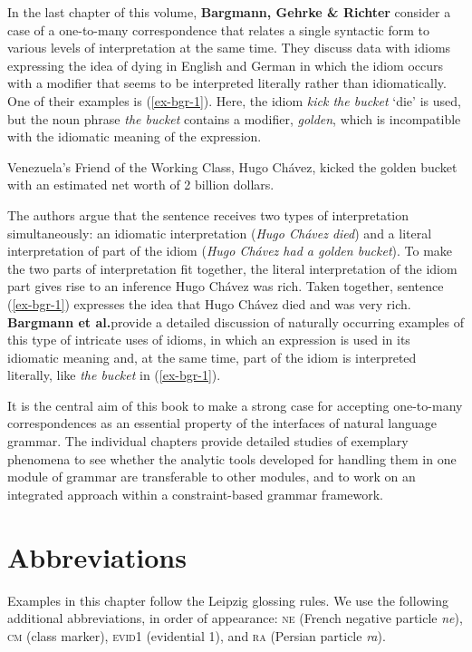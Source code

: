 \documentclass[output=paper]{langscibook}
\begin{document}
\bigskip\noindent In the last chapter of this volume,
\textbf{Bargmann, Gehrke \& Richter} consider a case of a one-to-many
correspondence that relates a single syntactic form to various levels
of interpretation at the same time.  They discuss data with idioms
expressing the idea of dying in English and German in which the idiom
occurs with a modifier that seems to be interpreted literally rather
than idiomatically.  One of their examples is (\ref{ex-bgr-1}). Here,
the idiom \textit{kick the bucket} `die' is used, but the noun phrase
\textit{the bucket} contains a modifier, \textit{golden}, which is
incompatible with the idiomatic meaning of the expression.

\ea \label{ex-bgr-1}
Venezuela’s Friend of the Working Class, Hugo Chávez, kicked the golden
bucket with an estimated net worth of 2 billion dollars.
\z

The authors argue that the sentence receives two types of
interpretation simultaneously: an idiomatic interpretation
(\textit{Hugo Chávez died}) and a literal interpretation of part of
the idiom (\textit{Hugo Chávez had a golden bucket}).  To make the two
parts of interpretation fit together, the literal interpretation of
the idiom part gives rise to an inference Hugo Chávez was rich.  Taken
together, sentence (\ref{ex-bgr-1}) expresses the idea that Hugo
Chávez died and was very rich.  \textbf{Bargmann et al.}\@ provide a
detailed discussion of naturally occurring examples of this type of
intricate uses of idioms, in which an expression is used in its
idiomatic meaning and, at the same time, part of the idiom is
interpreted literally, like \textit{the bucket} in (\ref{ex-bgr-1}).


\bigskip%
It is the central aim of this book to make a strong case for accepting
one-to-many correspondences as an essential property of the interfaces
of natural language grammar. The individual chapters provide detailed
studies of exemplary phenomena to see whether the analytic tools
developed for handling them in one module of grammar are transferable
to other modules, and to work on an integrated approach within a
constraint-based grammar framework.

\section*{Abbreviations}

Examples in this chapter follow the Leipzig glossing rules. We use the
following additional abbreviations, in order of appearance:
\textsc{ne} (French negative particle \textit{ne}), \textsc{cm} (class
marker), \textsc{evid1} (evidential 1), and \textsc{ra} (Persian
particle \textit{ra}).
\end{document}

